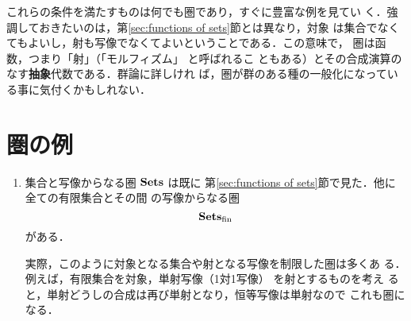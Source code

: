 これらの条件を満たすものは何でも圏であり，すぐに豊富な例を見てい
く．強調しておきたいのは，第\ref{sec:functions of sets}節とは異なり，対象
は集合でなくてもよいし，射も写像でなくてよいということである．この意味で，
圏は函数，つまり「射」（「モルフィズム」
と呼ばれるこ
ともある）とその合成演算のなす{\bfseries 抽象}代数である．群論に詳しけれ
ば，圏が群のある種の一般化になっている事に気付くかもしれない．

\section{圏の例}
\label{Sec:Example of Categories}
\begin{enumerate}
 \item 集合と写像からなる圏 $\mathbf{Sets}$ は既に
       第\ref{sec:functions of sets}節で見た．他に全ての有限集合とその間
       の写像からなる圏
       \[
	\mathbf{Sets}_{\rm fin}
       \]
       がある．

       実際，このように対象となる集合や射となる写像を制限した圏は多くあ
       る．例えば，有限集合を対象，単射写像（1対1写像）
       を射とするものを考え
       ると，単射どうしの合成は再び単射となり，恒等写像は単射なので
       これも圏になる．


\end{enumerate}
